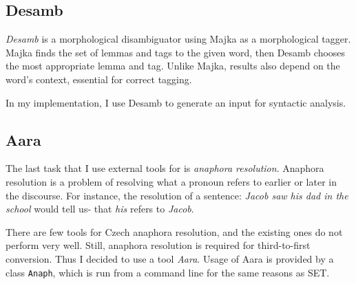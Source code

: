 \subsection{Desamb}

\emph{Desamb} is a morphological disambiguator using Majka as a morphological tagger. Majka finds the set of lemmas and tags to the given word, then Desamb chooses the most appropriate lemma and tag. Unlike Majka, results also depend on the word's context, essential for correct tagging.

In my implementation, I use Desamb to generate an input for syntactic analysis.

\subsection{Aara}

The last task that I use external tools for is \emph{anaphora resolution}. Anaphora resolution is a problem of resolving what a pronoun refers to earlier or later in the discourse. For instance, the resolution of a sentence: \emph{Jacob saw his dad in the school} would tell us- that \emph{his} refers to \emph{Jacob}.

There are few tools for Czech anaphora resolution, and the existing ones do not perform very well. Still, anaphora resolution is required for third-to-first conversion. Thus I decided to use a tool \emph{Aara}. Usage of Aara is provided by a class \texttt{Anaph}, which is run from a command line for the same reasons as SET.
